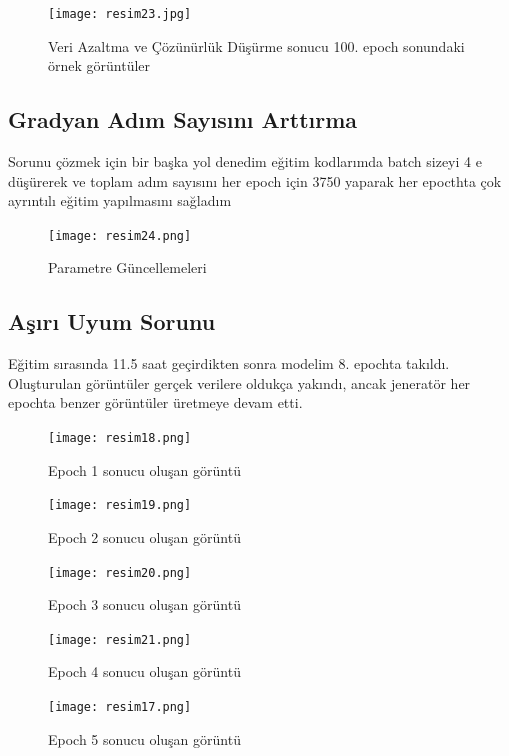 \documentclass[10pt]{article}
\begin{document}
	
	
	\begin{figure}[htbp]
		\centering
		\texttt{[image: resim23.jpg]}
		\caption{Veri Azaltma ve Çözünürlük Düşürme sonucu 100. epoch sonundaki örnek görüntüler  }
		\label{fig:uretici_tuketici}
	\end{figure}
	
	\subsection{Gradyan Adım Sayısını Arttırma}
	Sorunu çözmek için bir başka yol denedim eğitim kodlarımda batch sizeyi 4 e düşürerek ve toplam adım sayısını her epoch için 3750 yaparak her epocthta çok ayrıntılı eğitim yapılmasını sağladım 
	\begin{figure}[htbp]
		\centering
		\texttt{[image: resim24.png]}
		\caption{Parametre Güncellemeleri   }
		\label{fig:uretici_tuketici}
	\end{figure}
	
	\subsection{Aşırı Uyum Sorunu}
	Eğitim sırasında 11.5 saat geçirdikten sonra modelim 8. epochta takıldı. Oluşturulan görüntüler gerçek verilere oldukça yakındı, ancak jeneratör her epochta benzer görüntüler üretmeye devam etti.
	\begin{figure}[htbp]
		\centering
		\texttt{[image: resim18.png]}
		\caption{Epoch 1 sonucu oluşan görüntü}
		\label{fig:uretici_tuketici}
	\end{figure}
	
	\begin{figure}[htbp]
		\centering
		\texttt{[image: resim19.png]}
		\caption{Epoch 2 sonucu oluşan görüntü}
		\label{fig:uretici_tuketici}
	\end{figure}
	
	\begin{figure}[htbp]
		\centering
		\texttt{[image: resim20.png]}
		\caption{Epoch 3 sonucu oluşan görüntü}
		\label{fig:uretici_tuketici}
	\end{figure}
	
	\begin{figure}[htbp]
		\centering
		\texttt{[image: resim21.png]}
		\caption{Epoch 4 sonucu oluşan görüntü}
		\label{fig:uretici_tuketici}
	\end{figure}
	
	\begin{figure}[htbp]
		\centering
		\texttt{[image: resim17.png]}
		\caption{Epoch 5 sonucu oluşan görüntü}
		\label{fig:uretici_tuketici}
	\end{figure}
	
\end{document}
